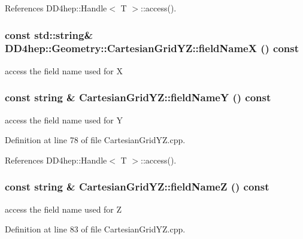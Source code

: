 References DD4hep::Handle$<$ T $>$::access().\hypertarget{class_d_d4hep_1_1_geometry_1_1_cartesian_grid_y_z_abf3ec171bf18377a98c042be1b84cfa6}{
\subsubsection[{fieldNameX}]{\setlength{\rightskip}{0pt plus 5cm}const std::string\& DD4hep::Geometry::CartesianGridYZ::fieldNameX () const}}
\label{class_d_d4hep_1_1_geometry_1_1_cartesian_grid_y_z_abf3ec171bf18377a98c042be1b84cfa6}


access the field name used for X \hypertarget{class_d_d4hep_1_1_geometry_1_1_cartesian_grid_y_z_aa54f02a42ce3caf3fee0fffdb7105bc2}{
\subsubsection[{fieldNameY}]{\setlength{\rightskip}{0pt plus 5cm}const {\bf string} \& CartesianGridYZ::fieldNameY () const}}
\label{class_d_d4hep_1_1_geometry_1_1_cartesian_grid_y_z_aa54f02a42ce3caf3fee0fffdb7105bc2}


access the field name used for Y 

Definition at line 78 of file CartesianGridYZ.cpp.

References DD4hep::Handle$<$ T $>$::access().\hypertarget{class_d_d4hep_1_1_geometry_1_1_cartesian_grid_y_z_a51881162bbb8a8102601d5d8a42ddd18}{
\subsubsection[{fieldNameZ}]{\setlength{\rightskip}{0pt plus 5cm}const {\bf string} \& CartesianGridYZ::fieldNameZ () const}}
\label{class_d_d4hep_1_1_geometry_1_1_cartesian_grid_y_z_a51881162bbb8a8102601d5d8a42ddd18}


access the field name used for Z 

Definition at line 83 of file CartesianGridYZ.cpp.

